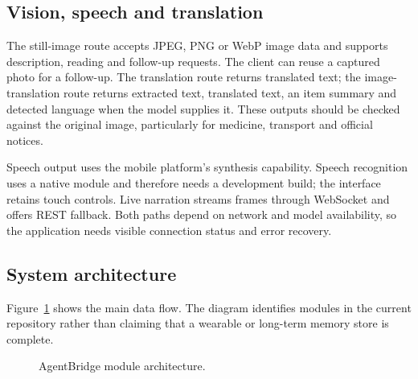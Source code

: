 \documentclass[12pt,a4paper,oneside]{report}
\begin{document}
\subsection{Vision, speech and translation}
The still-image route accepts JPEG, PNG or WebP image data and supports description, reading and follow-up requests. The client can reuse a captured photo for a follow-up. The translation route returns translated text; the image-translation route returns extracted text, translated text, an item summary and detected language when the model supplies it. These outputs should be checked against the original image, particularly for medicine, transport and official notices.

Speech output uses the mobile platform's synthesis capability. Speech recognition uses a native module and therefore needs a development build; the interface retains touch controls. Live narration streams frames through WebSocket and offers REST fallback. Both paths depend on network and model availability, so the application needs visible connection status and error recovery.

\subsection{System architecture}
Figure~\ref{fig:arch} shows the main data flow. The diagram identifies modules in the current repository rather than claiming that a wearable or long-term memory store is complete.
\begin{figure}[H]\centering
\setlength{\fboxsep}{7pt}
\caption{AgentBridge module architecture.}\label{fig:arch}
\end{figure}
\end{document}
